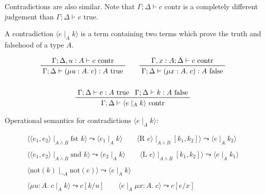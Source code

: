 \documentclass[a4paper,11pt]{article}
\begin{document}
{{        Contradictions are also similar. Note that \(\Gamma;\Delta\vdash c\text{ contr}\) is a completely different
        judgement than \(\Gamma;\Delta\vdash c\text{ true}\).

        A contradiction \(\langle e \mid_A k \rangle\) is a term containing two terms which prove the truth and
        falsehood of a type \(A\).

        \begin{gather*}
        \prftree[r]{}
        {\Gamma;\Delta,u:A\vdash c\text{ contr}}
        {\Gamma;\Delta\vdash (\mu u:A.\;c):A\text{ true}}
        \qquad
        \prftree[r]{}
        {\Gamma,x:A;\Delta\vdash c\text{ contr}}
        {\Gamma;\Delta\vdash (\mu x:A.\;c):A\text{ false}}
        \\
        \\
        \prftree[r]{}
        {\Gamma;\Delta\vdash e:A \text{ true}}
        {\Gamma;\Delta\vdash k:A \text{ false}}
        {\Gamma;\Delta\vdash \langle e \mid_A k \rangle \text{ contr}}
        \\
        \end{gather*}

        Operational semantics for contradictions \(\langle e \mid_A k \rangle\):

        \begin{gather*}
        \langle\langle e_1,e_2 \rangle \mid_{A \wedge B} \text{fst }k\rangle \leadsto \langle e_1 \mid_A k \rangle
        \qquad
        \langle \text{R }e \rangle \mid_{A \wedge B} [k_1,k_2] \rangle \leadsto \langle e \mid_A k_2 \rangle
        \\
        \\
        \langle\langle e_1,e_2 \rangle \mid_{A \wedge B} \text{snd }k\rangle \leadsto \langle e_2 \mid_A k \rangle
        \qquad
        \langle \text{L }e \rangle \mid_{A \wedge B} [k_1,k_2] \rangle \leadsto \langle e \mid_A k_1 \rangle
        \\
        \\
        \langle \text{not}(k) \mid_{\neg A} \text{not}(e) \rangle \leadsto \langle e \mid_A k \rangle
        \\
        \\
        \langle \mu u:A.\;c \mid_A k \rangle \leadsto c[k/u]
        \qquad
        \langle e \mid_A \mu x:A.\;c \rangle \leadsto c[e/x]
        \end{gather*}

}}
\end{document}
